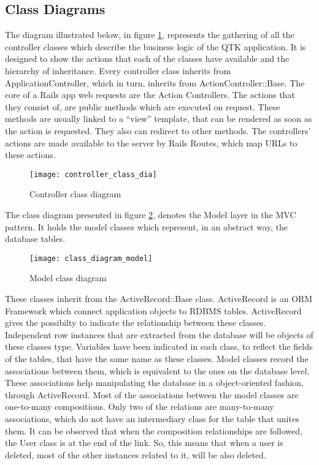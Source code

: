 \subsection{Class Diagrams}

The diagram illustrated below, in figure \ref{controller_class}, represents the gathering of all the controller classes which describe the business logic of the QTK application. It is designed to show the actions that each of the classes have available and the hierarchy of inheritance. Every controller class inherits from ApplicationController, which in turn, inherits from ActionController::Base. The core of a Rails app web requests are the Action Controllers. The actions that they consist of, are public methods which are executed on request. These methods are usually linked to a ``view'' template, that can be rendered as soon as the action is requested. They also can redirect to other methods. The controllers' actions are made available to the server by Rails Routes, which map URLs to these actions. 

\begin{figure}[!ht]
\centering
\texttt{[image: controller\_class\_dia]}
\caption{Controller class diagram}\label{controller_class}
\end{figure}

The class diagram presented in figure \ref{model_class}, denotes the Model layer in the MVC pattern. It holds the model classes which represent, in an abstract way, the database tables. 

\begin{figure}[!ht]
\centering
\texttt{[image: class\_diagram\_model]}
\caption{Model class diagram}\label{model_class}
\end{figure}

These classes inherit from the ActiveRecord::Base class. ActiveRecord is an ORM Framework which connect application objects to RDBMS tables. ActiveRecord gives the possibilty to indicate the relationship between these classes. Independent row instances that are extracted from the database will be objects of these classes type. Variables have been indicated in each class, to reflect the fields of the tables, that have the same name as these classes. Model classes record the associations between them, which is equivalent to the ones on the database level. These associations help manipulating the database in a object-oriented fashion, through ActiveRecord. Most of the associations between the model classes are one-to-many compositions. Only two of the relations are many-to-many associations, which do not have an intermediary class for the table that unites them. It can be observed that when the composition relationships are followed, the User class is at the end of the link. So, this means that when a user is deleted, most of the other instances related to it, will be also deleted. 

